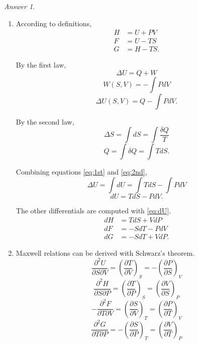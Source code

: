 \documentclass[a4paper, 12pt]{article}
\theoremstyle{definition}
\theoremstyle{remark}
\newtheorem*{answer}{Answer}
\begin{document}
\begin{answer}
    \begin{enumerate}
        \item According to definitions,
            \begin{align*}
                H &= U + PV \\
                F &= U - TS \\
                G &= H - TS.
            \end{align*}

            By the first law,
            \[ \Delta U = Q + W \]
            \[ W(S, V) = -\int PdV \]
            \begin{equation}
                \Delta U(S, V) = Q -\int PdV. \label{eq:1st}
            \end{equation}

            By the second law,
            \[ \Delta S = \int dS = \int \frac{\delta Q}{T} \]
            \begin{equation}
                Q = \int \delta Q = \int TdS. \label{eq:2nd}
            \end{equation}

            Combining equations \eqref{eq:1st} and \eqref{eq:2nd},
            \[ \Delta U = \int dU = \int TdS - \int PdV \]
            \begin{equation}
                dU = TdS - PdV. \label{eq:dU}
            \end{equation}

            The other differentials are computed with \eqref{eq:dU}.
            \begin{align*}
                dH &= TdS + VdP \\
                dF &= -SdT - PdV \\
                dG &= -SdT + VdP.
            \end{align*}

        \item Maxwell relations can be derived with Schwarz's theorem.
            \[
                \frac{\partial^2 U}{\partial S \partial V}
                = \left( \frac{\partial T}{\partial V} \right)_S
                = -\left( \frac{\partial P}{\partial S} \right)_V
            \]
            \[
                \frac{\partial^2 H}{\partial S \partial P}
                = \left( \frac{\partial T}{\partial P} \right)_S
                = \left( \frac{\partial V}{\partial S} \right)_P
            \]
            \[
                -\frac{\partial^2 F}{\partial T \partial V}
                = \left( \frac{\partial S}{\partial V} \right)_T
                = \left( \frac{\partial P}{\partial T} \right)_V
            \]
            \[
                \frac{\partial^2 G}{\partial T \partial P}
                = -\left( \frac{\partial S}{\partial P} \right)_T
                = \left( \frac{\partial V}{\partial T} \right)_P
            \]
    \end{enumerate}
\end{answer}
\end{document}
